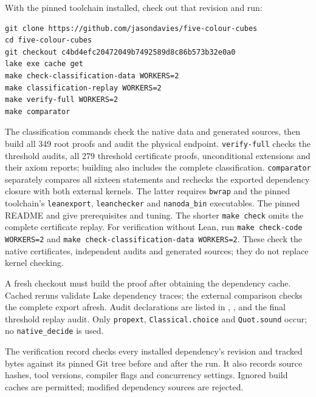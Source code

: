 With the pinned toolchain installed, check out that revision and run:
\begin{verbatim}
git clone https://github.com/jasondavies/five-colour-cubes
cd five-colour-cubes
git checkout c4bd4efc20472049b7492589d8c86b573b32e0a0
lake exe cache get
make check-classification-data WORKERS=2
make classification-replay WORKERS=2
make verify-full WORKERS=2
make comparator
\end{verbatim}
The classification commands check the native data and generated sources,
then build all 349 root proofs and audit the physical endpoint.
\texttt{verify-full} checks the threshold audits, all 279 threshold certificate
proofs, unconditional extensions and their axiom reports; building
 also includes the complete classification.
\texttt{comparator} separately compares all sixteen statements and rechecks
the exported dependency closure with both external kernels. The latter requires
\texttt{bwrap} and the pinned toolchain's \texttt{leanexport},
\texttt{leanchecker} and \texttt{nanoda\_bin} executables.
The pinned README and  give prerequisites and tuning.
The shorter \texttt{make check} omits the complete certificate replay.
For verification without Lean, run \texttt{make check-code WORKERS=2}
and \texttt{make check-classification-data WORKERS=2}. These check the
native certificates, independent audits and generated sources; they do not
replace kernel checking.

A fresh checkout must build the proof after obtaining the dependency cache.
Cached reruns validate Lake dependency traces; the external comparison checks
the complete export afresh. Audit declarations are listed in ,
,  and the final
threshold replay audit.
Only \texttt{propext}, \texttt{Classical.choice} and \texttt{Quot.sound} occur;
no \texttt{native\_decide} is used.

The verification record checks every installed dependency's revision and
tracked bytes against its pinned Git tree before and after the run. It also
records source hashes, tool versions, compiler flags and concurrency settings.
Ignored build caches are permitted; modified dependency sources are rejected.

